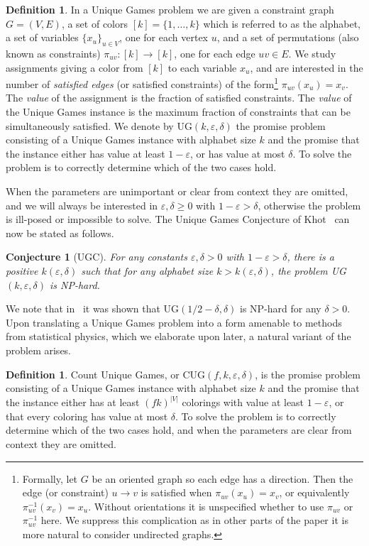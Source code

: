 \documentclass[10pt,a4paper]{article}
\newtheorem*{conjecture*}{Conjecture}
\theoremstyle{definition}
\newtheorem{definition}[theorem]{Definition}
\newcommand*{\eps}{\varepsilon}
\newcommand*{\UG}[1][]{UG$(#1)$}
\newcommand*{\CUG}[1][]{CUG$(#1)$}
\begin{document}
\begin{definition}
In a Unique Games problem we are given a constraint graph $G = (V,E)$, a set of colors $[k] = \{1,\dotsc,k\}$ which is referred to as the alphabet, a set of variables $\{x_u\}_{u\in V}$, one for each vertex $u$, and a set of permutations (also known as constraints) $\pi_{uv} : [k]\to [k]$, one for each edge $uv\in E$. 
We study assignments giving a color from $[k]$ to each variable $x_u$, and are interested in the number of \emph{satisfied edges} (or satisfied constraints) of the form\footnote{Formally, let $G$ be an oriented graph so each edge has a direction. Then the edge (or constraint) $u\to v$ is satisfied when $\pi_{uv}(x_u)=x_v$, or equivalently $\pi_{uv}^{-1}(x_v)=x_u$. Without orientations it is unspecified whether to use $\pi_{uv}$ or $\pi_{uv}^{-1}$ here. We suppress this complication as in other parts of the paper it is more natural to consider undirected graphs.} $\pi_{uv}(x_u)=x_v$. The \emph{value} of the assignment is the fraction of satisfied constraints. 
The \emph{value} of the Unique Games instance is the maximum fraction of constraints that can be simultaneously satisfied.
%
We denote by \UG[k,\eps,\delta] the promise problem consisting of a Unique Games instance with alphabet size $k$ and the promise that the instance either has value at least $1-\eps$, or has value at most $\delta$. 
To solve the problem is to correctly determine which of the two cases hold. 
\end{definition}
%
When the parameters are unimportant or clear from context they are omitted, and we will always be interested in $\eps,\delta\ge 0$ with $1-\eps > \delta$, otherwise the problem is ill-posed or impossible to solve. 
The Unique Games Conjecture of Khot~\cite{Khot02a} can now be stated as follows.
%
\begin{conjecture*}[UGC]
For any constants $\eps,\delta > 0$ with $1-\eps>\delta$, there is a positive $k(\eps,\delta)$ such that for any alphabet size $k > k(\eps, \delta)$, the problem \UG[k,\eps,\delta] is NP-hard.
\end{conjecture*}
\noindent
We note that in~\cite{DKKMS18a,DKKMS18} it was shown that \UG[1/2-\delta,\delta] is NP-hard for any $\delta>0$.
%
Upon translating a Unique Games problem into a form amenable to methods from statistical physics, which we elaborate upon later, a natural variant of the problem arises.
%
\begin{definition}
Count Unique Games, or \CUG[f,k,\eps,\delta], is the promise problem consisting of a Unique Games instance with alphabet size $k$ and the promise that the instance either has at least $(fk)^{|V|}$ colorings with value at least $1-\eps$, or that every coloring has value at most $\delta$. 
To solve the problem is to correctly determine which of the two cases hold, and when the parameters are clear from context they are omitted. 
\end{definition}
\end{document}
